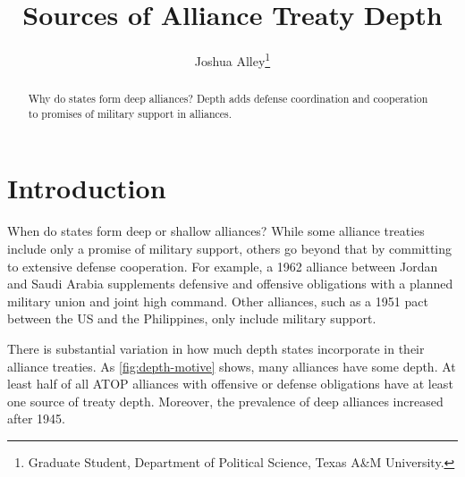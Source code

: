 \documentclass[12pt]{article}
\title{\textbf{Sources of Alliance Treaty Depth}}
\author{Joshua Alley\footnote{Graduate Student,
Department of Political Science, Texas A\&M University.}}
\date{}
\begin{document}
\maketitle 

\doublespace 

\begin{abstract}
Why do states form deep alliances? 
Depth adds defense coordination and cooperation to promises of military support in alliances.
\end{abstract}


\newpage 


\section{Introduction}


When do states form deep or shallow alliances? 
While some alliance treaties include only a promise of military support, others go beyond that by committing to extensive defense cooperation. 
For example, a 1962 alliance between Jordan and Saudi Arabia supplements defensive and offensive obligations with a planned military union and joint high command. 
Other alliances, such as a 1951 pact between the US and the Philippines, only include military support. 


There is substantial variation in how much depth states incorporate in their alliance treaties. 
As \autoref{fig:depth-motive} shows, many alliances have some depth. 
At least half of all ATOP alliances with offensive or defense obligations have at least one source of treaty depth.   
Moreover, the prevalence of deep alliances increased after 1945. 
\end{document}
